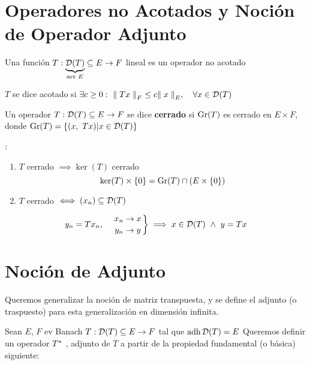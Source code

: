 
\renewcommand{\catnum}{\theNPclase \ No Presencial}%
\renewcommand{\fecha}{14 de abril de 2020}


\section*{Operadores no Acotados y Noción de Operador Adjunto}

\begin{defn}
Una función $T: \underbrace{\mathcal{D}(T)}_{\text{sev $E$}}  \subseteq E \to F$ lineal es un operador no acotado
\end{defn}

\begin{defn}
$T$ se dice acotado si $\exists c \geq 0 :\ \norm[F]{Tx} \leq c \norm[E]{x}, \quad \forall x \in \cd(T)$
\end{defn}

\begin{defn}
Un operador  $T: \mathcal{D}(T)  \subseteq E \to F$ se dice \textbf{cerrado} si $\operatorname{\mathop{\text{\upshape{Gr}}}}(T)$ es cerrado en $E \times F$, donde $\operatorname{\mathop{\text{\upshape{Gr}}}}(T)= \{ (x,\ Tx) | x \in \mathcal{D}(T) \}$
\end{defn}

\begin{note}: 
\begin{enumerate}[(1)]
    \item $T$ cerrado $\implies \ker (T)$  cerrado $$\ker (T) \times \{ 0 \} = \operatorname{\mathop{\text{\upshape{Gr}}}} (T) \cap (E \times \{ 0 \})$$
    
    \item$T$ cerrado $\iff (x_n) \subseteq \mathcal{D}(T)$
\end{enumerate}
$$y_n = T x_n , \quad 
\left.
x_n \to x \atop
y_n \to y
\right \} \implies x \in \mathcal{D}(T) \ \wedge \ y = T x$$
\end{note}

\section{Noción de Adjunto}

Queremos generalizar la noción de matriz transpuesta, y se define el adjunto (o traspuesto) para esta generalización en dimensión infinita.

Sean $E$, $F$ ev Banach
$T : \mathcal{D}(T) \subseteq E \to F$ tal que $\operatorname{\mathop{\text{\upshape{adh}}}} \mathcal{D}(T) = E$
Queremos definir un operador $T^{*}$ , adjunto de $T$ a partir de la propiedad fundamental (o básica) siguiente:

